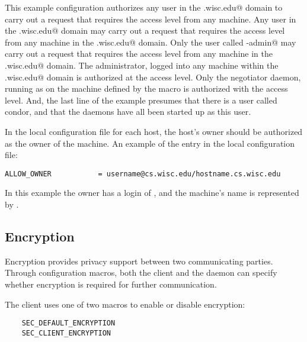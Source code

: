 This example configuration authorizes
any user in the 
\verb@cs.wisc.edu@ domain to 
carry out a request that requires the 
 access level
from any machine.
Any user in the 
\verb@cs.wisc.edu@ domain may 
carry out a request that requires the 
 access level
from any machine in the
\verb@cs.wisc.edu@ domain.
Only the user called \verb@condor-admin@ may 
carry out a request that requires the 
 access level
from any machine in the
\verb@cs.wisc.edu@ domain.
The administrator, logged into any machine within
the \verb@cs.wisc.edu@ domain is authorized at the
 access level.
Only the negotiator daemon, running as
\verb@condor@ on the machine defined by the
 macro is authorized 
with the
 access level.
And, the last line of the example presumes that there is a
user called condor, and that the daemons have all been started
up as this user.

In the local configuration file for each host, the host's
owner should be authorized
as the owner of the machine.
An example of the entry in the local configuration file:
\footnotesize
\begin{verbatim}
ALLOW_OWNER           = username@cs.wisc.edu/hostname.cs.wisc.edu
\end{verbatim}
\normalsize
In this example the owner has a login of
\verb@username@, and the machine's name is represented by
\verb@hostname@.

\subsection{\label{sec:Security-Encryption}Encryption}
Encryption provides privacy support between two communicating parties.
Through configuration macros, both the client and the daemon
can specify whether encryption is required for further communication.

The client uses one of two macros to enable or disable encryption:
\begin{verbatim}
    SEC_DEFAULT_ENCRYPTION
    SEC_CLIENT_ENCRYPTION
\end{verbatim}

